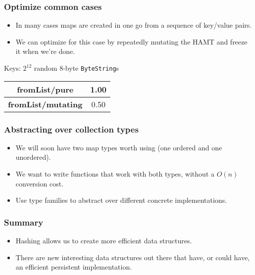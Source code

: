 \documentclass[xetex,mathserif,serif]{beamer}
\begin{document}
\begin{frame}
  \frametitle{Optimize common cases}
  \begin{itemize}
  \item In many cases maps are created in one go from a sequence of
    key/value pairs.
  \item We can optimize for this case by repeatedly mutating the HAMT
    and freeze it when we're done.
  \end{itemize}

  \bigskip
  Keys: $2^{12}$ random 8-byte \lstinline!ByteString!s

  \bigskip
  \begin{tabular}{|c|c|}
    \hline \textbf{fromList/pure} & 1.00 \\
    \hline \textbf{fromList/mutating} & 0.50 \\
    \hline
  \end{tabular}
\end{frame}

\begin{frame}
  \frametitle{Abstracting over collection types}
  \begin{itemize}
  \item We will soon have two map types worth using (one ordered and one
    unordered).
  \item We want to write functions that work with both types, without a
    $O(n)$ conversion cost.
  \item Use type families to abstract over different concrete
    implementations.
  \end{itemize}
\end{frame}

\begin{frame}
  \frametitle{Summary}
  \begin{itemize}
  \item Hashing allows us to create more efficient data structures.
  \item There are new interesting data structures out there that have,
    or could have, an efficient persistent implementation.
  \end{itemize}
\end{frame}
\end{document}
